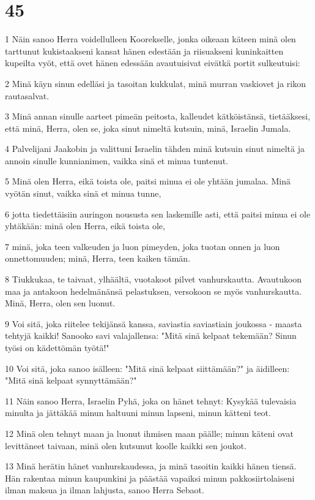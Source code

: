 \chapter{45}

\par 1 Näin sanoo Herra voidellulleen Koorekselle, jonka oikeaan käteen minä olen tarttunut kukistaakseni kansat hänen edestään ja riisuakseni kuninkaitten kupeilta vyöt, että ovet hänen edessään avautuisivat eivätkä portit sulkeutuisi:
\par 2 Minä käyn sinun edelläsi ja tasoitan kukkulat, minä murran vaskiovet ja rikon rautasalvat.
\par 3 Minä annan sinulle aarteet pimeän peitosta, kalleudet kätköistänsä, tietääksesi, että minä, Herra, olen se, joka sinut nimeltä kutsuin, minä, Israelin Jumala.
\par 4 Palvelijani Jaakobin ja valittuni Israelin tähden minä kutsuin sinut nimeltä ja annoin sinulle kunnianimen, vaikka sinä et minua tuntenut.
\par 5 Minä olen Herra, eikä toista ole, paitsi minua ei ole yhtään jumalaa. Minä vyötän sinut, vaikka sinä et minua tunne,
\par 6 jotta tiedettäisiin auringon noususta sen laskemille asti, että paitsi minua ei ole yhtäkään: minä olen Herra, eikä toista ole,
\par 7 minä, joka teen valkeuden ja luon pimeyden, joka tuotan onnen ja luon onnettomuuden; minä, Herra, teen kaiken tämän.
\par 8 Tiukkukaa, te taivaat, ylhäältä, vuotakoot pilvet vanhurskautta. Avautukoon maa ja antakoon hedelmänänsä pelastuksen, versokoon se myös vanhurskautta. Minä, Herra, olen sen luonut.
\par 9 Voi sitä, joka riitelee tekijänsä kanssa, saviastia saviastiain joukossa - maasta tehtyjä kaikki! Sanooko savi valajallensa: "Mitä sinä kelpaat tekemään? Sinun työsi on kädettömän työtä!"
\par 10 Voi sitä, joka sanoo isälleen: "Mitä sinä kelpaat siittämään?" ja äidilleen: "Mitä sinä kelpaat synnyttämään?"
\par 11 Näin sanoo Herra, Israelin Pyhä, joka on hänet tehnyt: Kysykää tulevaisia minulta ja jättäkää minun haltuuni minun lapseni, minun kätteni teot.
\par 12 Minä olen tehnyt maan ja luonut ihmisen maan päälle; minun käteni ovat levittäneet taivaan, minä olen kutsunut koolle kaikki sen joukot.
\par 13 Minä herätin hänet vanhurskaudessa, ja minä tasoitin kaikki hänen tiensä. Hän rakentaa minun kaupunkini ja päästää vapaiksi minun pakkosiirtolaiseni ilman maksua ja ilman lahjusta, sanoo Herra Sebaot.
